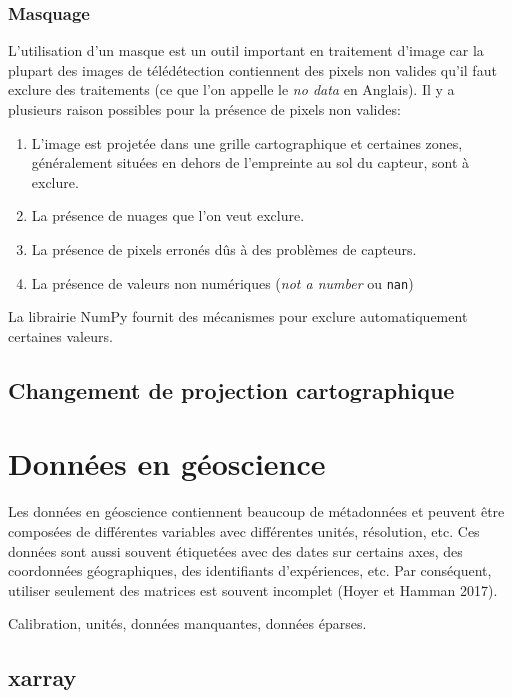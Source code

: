 \documentclass[
  11pt,
  letterpaper,
  open=any,
  twoside=false,
  french]{scrbook}
\begin{document}
\subsubsection{Masquage}\label{masquage}

L'utilisation d'un masque est un outil important en traitement d'image
car la plupart des images de télédétection contiennent des pixels non
valides qu'il faut exclure des traitements (ce que l'on appelle le
\emph{no data} en Anglais). Il y a plusieurs raison possibles pour la
présence de pixels non valides:

\begin{enumerate}
\def\labelenumi{\arabic{enumi}.}
\item
  L'image est projetée dans une grille cartographique et certaines
  zones, généralement situées en dehors de l'empreinte au sol du
  capteur, sont à exclure.
\item
  La présence de nuages que l'on veut exclure.
\item
  La présence de pixels erronés dûs à des problèmes de capteurs.
\item
  La présence de valeurs non numériques (\emph{not a number} ou
  \texttt{nan})
\end{enumerate}

La librairie NumPy fournit des mécanismes pour exclure automatiquement
certaines valeurs.

\subsection{Changement de projection
cartographique}\label{changement-de-projection-cartographique}

\section{Données en géoscience}\label{donnuxe9es-en-guxe9oscience}

Les données en géoscience contiennent beaucoup de métadonnées et peuvent
être composées de différentes variables avec différentes unités,
résolution, etc. Ces données sont aussi souvent étiquetées avec des
dates sur certains axes, des coordonnées géographiques, des identifiants
d'expériences, etc. Par conséquent, utiliser seulement des matrices est
souvent incomplet (Hoyer et Hamman 2017).

Calibration, unités, données manquantes, données éparses.

\subsection{xarray}\label{xarray}
\end{document}
